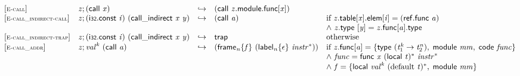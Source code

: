 $$
\begin{array}{@{}l@{}lcl@{}l@{}}
{[\textsc{\scriptsize E{-}call}]} \quad & {\mathit{z}} ; (\mathsf{call}~{\mathit{x}}) &\hookrightarrow& (\mathsf{call}~{\mathit{z}}.\mathsf{module}.\mathsf{func}{}[{\mathit{x}}]) &  \\
{[\textsc{\scriptsize E{-}call\_indirect{-}call}]} \quad & {\mathit{z}} ; (\mathsf{i{\scriptstyle32}}.\mathsf{const}~{\mathit{i}})~(\mathsf{call\_indirect}~{\mathit{x}}~{\mathit{y}}) &\hookrightarrow& (\mathsf{call}~{\mathit{a}}) &\quad
  \mbox{if}~{{\mathit{z}}.\mathsf{table}}{{}[{\mathit{x}}]}.\mathsf{elem}{}[{\mathit{i}}] = (\mathsf{ref.func}~{\mathit{a}}) \\
 &&&&\quad {\land}~{\mathit{z}}.\mathsf{type}~{}[{\mathit{y}}] = {\mathit{z}}.\mathsf{func}{}[{\mathit{a}}].\mathsf{type} \\
{[\textsc{\scriptsize E{-}call\_indirect{-}trap}]} \quad & {\mathit{z}} ; (\mathsf{i{\scriptstyle32}}.\mathsf{const}~{\mathit{i}})~(\mathsf{call\_indirect}~{\mathit{x}}~{\mathit{y}}) &\hookrightarrow& \mathsf{trap} &\quad
  \mbox{otherwise} \\
{[\textsc{\scriptsize E{-}call\_addr}]} \quad & {\mathit{z}} ; {{\mathit{val}}^{{\mathit{k}}}}~(\mathsf{call}~{\mathit{a}}) &\hookrightarrow& ({{\mathsf{frame}}_{{\mathit{n}}}}{\{{\mathit{f}}\}}~({{\mathsf{label}}_{{\mathit{n}}}}{\{\epsilon\}}~{{\mathit{instr}}^\ast})) &\quad
  \mbox{if}~{\mathit{z}}.\mathsf{func}{}[{\mathit{a}}] = \{ \begin{array}[t]{@{}l@{}}
\mathsf{type}~({{\mathit{t}}_{{1}}^{{\mathit{k}}}} \rightarrow {{\mathit{t}}_{{2}}^{{\mathit{n}}}}),\; \mathsf{module}~{\mathit{mm}},\; \mathsf{code}~{\mathit{func}} \}\end{array} \\
 &&&&\quad {\land}~{\mathit{func}} = \mathsf{func}~{\mathit{x}}~{(\mathsf{local}~{\mathit{t}})^\ast}~{{\mathit{instr}}^\ast} \\
 &&&&\quad {\land}~{\mathit{f}} = \{ \begin{array}[t]{@{}l@{}}
\mathsf{local}~{{\mathit{val}}^{{\mathit{k}}}}~{({\mathrm{default}}~{\mathit{t}})^\ast},\; \mathsf{module}~{\mathit{mm}} \}\end{array} \\
\end{array}
$$

\vspace{1ex}

